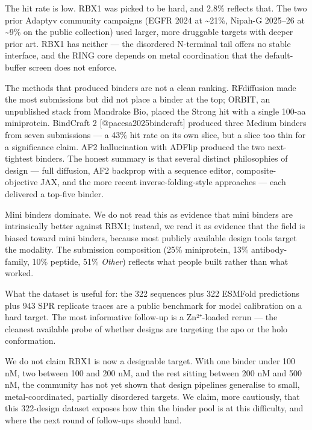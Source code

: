 The hit rate is low. RBX1 was picked to be hard, and 2.8\% reflects
that. The two prior Adaptyv community campaigns (EGFR 2024 at
\textasciitilde21\%, Nipah-G 2025--26 at \textasciitilde9\% on the
public collection) used larger, more druggable targets with deeper prior
art. RBX1 has neither --- the disordered N-terminal tail offers no
stable interface, and the RING core depends on metal coordination that
the default-buffer screen does not enforce.

The methods that produced binders are not a clean ranking. RFdiffusion
made the most submissions but did not place a binder at the top; ORBIT,
an unpublished stack from Mandrake Bio, placed the Strong hit with a
single 100-aa miniprotein. BindCraft 2 {[}@pacesa2025bindcraft{]}
produced three Medium binders from seven submissions --- a 43\% hit rate
on its own slice, but a slice too thin for a significance claim. AF2
hallucination with ADFlip produced the two next-tightest binders. The
honest summary is that several distinct philosophies of design --- full
diffusion, AF2 backprop with a sequence editor, composite-objective JAX,
and the more recent inverse-folding-style approaches --- each delivered
a top-five binder.

Mini binders dominate. We do not read this as evidence that mini binders
are intrinsically better against RBX1; instead, we read it as evidence
that the field is biased toward mini binders, because most publicly
available design tools target the modality. The submission composition
(25\% miniprotein, 13\% antibody-family, 10\% peptide, 51\%
\emph{Other}) reflects what people built rather than what worked.

What the dataset is useful for: the 322 sequences plus 322 ESMFold
predictions plus 943 SPR replicate traces are a public benchmark for
model calibration on a hard target. The most informative follow-up is a
Zn²⁺-loaded rerun --- the cleanest available probe of whether designs
are targeting the apo or the holo conformation.

We do not claim RBX1 is now a designable target. With one binder under
100 nM, two between 100 and 200 nM, and the rest sitting between 200 nM
and 500 nM, the community has not yet shown that design pipelines
generalise to small, metal-coordinated, partially disordered targets. We
claim, more cautiously, that this 322-design dataset exposes how thin
the binder pool is at this difficulty, and where the next round of
follow-ups should land.
